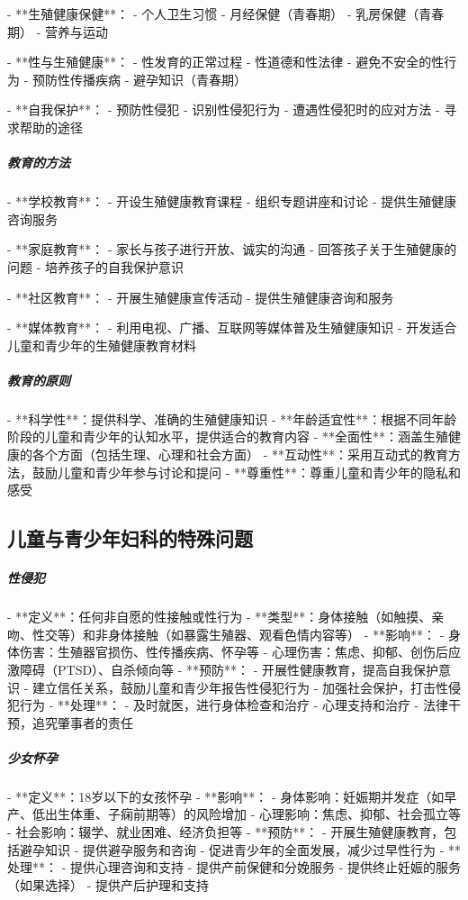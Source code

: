 \begin{enumerate}
- **生殖健康保健**：
  - 个人卫生习惯
  - 月经保健（青春期）
  - 乳房保健（青春期）
  - 营养与运动

- **性与生殖健康**：
  - 性发育的正常过程
  - 性道德和性法律
  - 避免不安全的性行为
  - 预防性传播疾病
  - 避孕知识（青春期）

- **自我保护**：
  - 预防性侵犯
  - 识别性侵犯行为
  - 遭遇性侵犯时的应对方法
  - 寻求帮助的途径

\subparagraph{教育的方法}

- **学校教育**：
  - 开设生殖健康教育课程
  - 组织专题讲座和讨论
  - 提供生殖健康咨询服务

- **家庭教育**：
  - 家长与孩子进行开放、诚实的沟通
  - 回答孩子关于生殖健康的问题
  - 培养孩子的自我保护意识

- **社区教育**：
  - 开展生殖健康宣传活动
  - 提供生殖健康咨询和服务

- **媒体教育**：
  - 利用电视、广播、互联网等媒体普及生殖健康知识
  - 开发适合儿童和青少年的生殖健康教育材料

\subparagraph{教育的原则}

- **科学性**：提供科学、准确的生殖健康知识
- **年龄适宜性**：根据不同年龄阶段的儿童和青少年的认知水平，提供适合的教育内容
- **全面性**：涵盖生殖健康的各个方面（包括生理、心理和社会方面）
- **互动性**：采用互动式的教育方法，鼓励儿童和青少年参与讨论和提问
- **尊重性**：尊重儿童和青少年的隐私和感受

\subsection{儿童与青少年妇科的特殊问题}

\subparagraph{性侵犯}

- **定义**：任何非自愿的性接触或性行为
- **类型**：身体接触（如触摸、亲吻、性交等）和非身体接触（如暴露生殖器、观看色情内容等）
- **影响**：
  - 身体伤害：生殖器官损伤、性传播疾病、怀孕等
  - 心理伤害：焦虑、抑郁、创伤后应激障碍（PTSD）、自杀倾向等
- **预防**：
  - 开展性健康教育，提高自我保护意识
  - 建立信任关系，鼓励儿童和青少年报告性侵犯行为
  - 加强社会保护，打击性侵犯行为
- **处理**：
  - 及时就医，进行身体检查和治疗
  - 心理支持和治疗
  - 法律干预，追究肇事者的责任

\subparagraph{少女怀孕}

- **定义**：18岁以下的女孩怀孕
- **影响**：
  - 身体影响：妊娠期并发症（如早产、低出生体重、子痫前期等）的风险增加
  - 心理影响：焦虑、抑郁、社会孤立等
  - 社会影响：辍学、就业困难、经济负担等
- **预防**：
  - 开展生殖健康教育，包括避孕知识
  - 提供避孕服务和咨询
  - 促进青少年的全面发展，减少过早性行为
- **处理**：
  - 提供心理咨询和支持
  - 提供产前保健和分娩服务
  - 提供终止妊娠的服务（如果选择）
  - 提供产后护理和支持


\end{enumerate}
